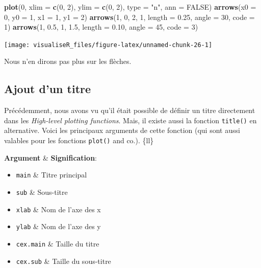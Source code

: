 \documentclass[]{article}
\newenvironment{Shaded}{\begin{snugshade}}{\end{snugshade}}
\newcommand{\DataTypeTok}[1]{\textcolor[rgb]{0.13,0.29,0.53}{#1}}
\newcommand{\DecValTok}[1]{\textcolor[rgb]{0.00,0.00,0.81}{#1}}
\newcommand{\FloatTok}[1]{\textcolor[rgb]{0.00,0.00,0.81}{#1}}
\newcommand{\KeywordTok}[1]{\textcolor[rgb]{0.13,0.29,0.53}{\textbf{#1}}}
\newcommand{\NormalTok}[1]{#1}
\newcommand{\OtherTok}[1]{\textcolor[rgb]{0.56,0.35,0.01}{#1}}
\newcommand{\StringTok}[1]{\textcolor[rgb]{0.31,0.60,0.02}{#1}}
\providecommand{\tightlist}{%
  \setlength{\itemsep}{0pt}\setlength{\parskip}{0pt}}
\begin{document}
\begin{Shaded}
\begin{Highlighting}[]
\KeywordTok{plot}\NormalTok{(}\DecValTok{0}\NormalTok{, }\DataTypeTok{xlim =} \KeywordTok{c}\NormalTok{(}\DecValTok{0}\NormalTok{, }\DecValTok{2}\NormalTok{), }\DataTypeTok{ylim =} \KeywordTok{c}\NormalTok{(}\DecValTok{0}\NormalTok{, }\DecValTok{2}\NormalTok{), }\DataTypeTok{type =} \StringTok{"n"}\NormalTok{, }\DataTypeTok{ann =} \OtherTok{FALSE}\NormalTok{)}
\KeywordTok{arrows}\NormalTok{(}\DataTypeTok{x0 =} \DecValTok{0}\NormalTok{, }\DataTypeTok{y0 =} \DecValTok{1}\NormalTok{, }\DataTypeTok{x1 =} \DecValTok{1}\NormalTok{, }\DataTypeTok{y1 =} \DecValTok{2}\NormalTok{)}
\KeywordTok{arrows}\NormalTok{(}\DecValTok{1}\NormalTok{, }\DecValTok{0}\NormalTok{, }\DecValTok{2}\NormalTok{, }\DecValTok{1}\NormalTok{, }\DataTypeTok{length =} \FloatTok{0.25}\NormalTok{, }\DataTypeTok{angle =} \DecValTok{30}\NormalTok{, }\DataTypeTok{code =} \DecValTok{1}\NormalTok{)}
\KeywordTok{arrows}\NormalTok{(}\DecValTok{1}\NormalTok{, }\FloatTok{0.5}\NormalTok{, }\DecValTok{1}\NormalTok{, }\FloatTok{1.5}\NormalTok{, }\DataTypeTok{length =} \FloatTok{0.10}\NormalTok{, }\DataTypeTok{angle =} \DecValTok{45}\NormalTok{, }\DataTypeTok{code =} \DecValTok{3}\NormalTok{)}
\end{Highlighting}
\end{Shaded}

\begin{center}\texttt{[image: visualiseR\_files/figure-latex/unnamed-chunk-26-1]} \end{center}

Nous n'en dirons pas plus sur les flèches.

\hypertarget{ajout-dun-titre}{%
\subsection{Ajout d'un titre}\label{ajout-dun-titre}}

Précédemment, nous avons vu qu'il était possible de définir un titre directement dans les \emph{High-level plotting functions}. Mais, il existe aussi la fonction \texttt{title()} en alternative. Voici les principaux arguments de cette fonction (qui sont aussi valables pour les fonctions \texttt{plot()} and co.).
\{ll\}

\textbf{Argument} \& \textbf{Signification}:

\begin{itemize}
\tightlist
\item
  \texttt{main} \& Titre principal
\item
  \texttt{sub} \& Sous-titre
\item
  \texttt{xlab} \& Nom de l'axe des x
\item
  \texttt{ylab} \& Nom de l'axe des y
\item
  \texttt{cex.main} \& Taille du titre
\item
  \texttt{cex.sub} \& Taille du sous-titre
\end{itemize}
\end{document}
